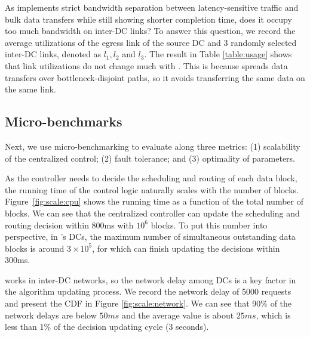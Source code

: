 As \name implements strict bandwidth separation between latency-sensitive traffic and bulk data transfers while still showing shorter completion time, does it occupy too much bandwidth on inter-DC links? To answer this question, we record the average utilizations of the egress link of the source DC and 3 randomly selected inter-DC links, denoted as $l_1,l_2$ and $l_3$. The result in Table \ref{table:usage} shows that link utilizations do not change much with \name. This is because \name spreads data transfers over bottleneck-disjoint paths, so it avoids transferring the same data on the same link.


\subsection{Micro-benchmarks}
\label{subsec:evaluation:benchmarks}

Next, we use micro-benchmarking to evaluate \name along three metrics:
(1) scalability of the centralized control;
(2) fault tolerance; and 
(3) optimality of \name parameters.

\label{subsec:evaluation:benchmarks:scalability}

As the controller needs to decide the scheduling and routing of each
data block, the running time of the control logic naturally scales 
with the number of blocks. Figure~\ref{fig:scale:cpu} shows the 
running time as a function of the total number of blocks. We can see
that the centralized \name controller can update the scheduling and 
routing decision within 800ms with $10^6$ blocks. To put this number 
into perspective, in \company's DCs, the maximum number of simultaneous 
outstanding data blocks is around $3\times 10^5$, for which \name can
finish updating the decisions within 300ms.

 \name works in inter-DC networks, so the network delay among DCs is a key factor in the algorithm updating process. We record the network delay of 5000 requests and present the CDF in Figure \ref{fig:scale:network}. We can see that 90\% of the network delays are below $50ms$ and the average value is about $25ms$, which is less than 1\% of the decision updating cycle (3 seconds).

